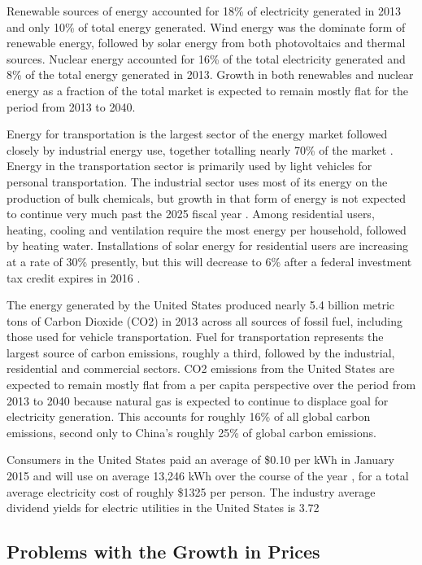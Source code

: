 Renewable sources of energy accounted for 18\% of electricity generated in 2013 
and only 10\% of total energy generated. Wind energy was the dominate form of 
renewable energy, followed by solar energy from both photovoltaics and thermal 
sources. Nuclear energy accounted for 16\% of the total electricity generated 
and 8\% of the total energy generated in 2013. Growth in both renewables and 
nuclear energy as a fraction of the total market is expected to remain mostly 
flat for the period from 2013 to 2040.

Energy for transportation is the largest sector of the energy market followed 
closely by industrial energy use, together totalling nearly 70\% of the market 
\cite{eiaAEO2015}. Energy in the transportation sector is primarily used by 
light vehicles for personal transportation. The industrial sector uses most of 
its energy on the production of bulk chemicals, but growth in that form of 
energy is not expected to continue very much past the 2025 fiscal year 
\cite{eiaAEO2015}. Among residential users, heating, cooling and ventilation 
require the most energy per household, followed by heating water. Installations 
of solar energy for residential users are increasing at a rate of 30\% 
presently, but this will decrease to 6\% after a federal investment tax credit 
expires in 2016 \cite{eiaAE2015}.

The energy generated by the United States produced nearly 5.4 billion metric 
tons of Carbon Dioxide (CO2) in 2013 \cite{eiaAEO2015} across all sources of 
fossil fuel, including those used for vehicle transportation. Fuel for 
transportation represents the largest source of carbon emissions, roughly a 
third, followed by the industrial, residential and commercial sectors. CO2 
emissions from the United States are expected to remain mostly flat from a per 
capita perspective over the period from 2013 to 2040 because natural gas is 
expected to continue to displace goal for electricity generation. This accounts 
for roughly 16\% of all global carbon emissions, second only to China’s roughly 
25\% of global carbon emissions.

Consumers in the United States paid an average of \$0.10 per kWh in January 2015 
\cite{eiaEPMTable} and will use on average 13,246 kWh over the course of the year 
\cite{worldbankEPC}, for a total average electricity cost of roughly \$1325 per 
person. The industry average dividend yields for electric utilities in the
United States is 3.72%

\subsection{Problems with the Growth in Prices}

